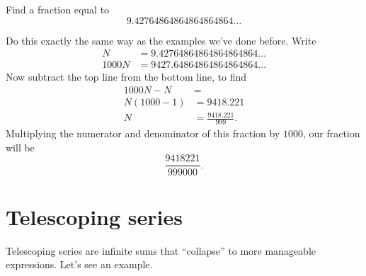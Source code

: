 \documentclass{ximera}
\begin{document}
\begin{example}
  Find a fraction equal to
  \[
  9.42764864864864864864\dots
  \]
  \begin{explanation}
    Do this exactly the same way as the examples we've done
    before. Write
    \begin{align*}
    N &=         9.42764864864864864864\dots\\
    1000 N &= 9427.64864864864864864\dots
    \end{align*}
    Now subtract the top line from the bottom line, to find
    \begin{align*}
      1000N - N &= \\
      N(1000-1) &= 9418.221\\
      N &= \frac{9418.221}{999}.
    \end{align*}
    Multiplying the numerator and denominator of this fraction by $1000$, 
     our fraction will be
    \[
    \frac{9418221}{999000}.
    \]
  \end{explanation}
\end{example}
    

\section{Telescoping series}

Telescoping series are infinite sums that ``collapse'' to more
manageable expressions.  Let's see an example.
\end{document}
